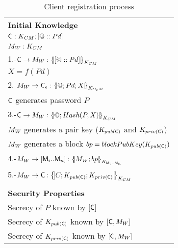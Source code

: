 \begin{table}[htb]
\footnotesize
\begin{center}
\caption{Client registration process}
\label{table:reqSessKey}
\begin{tabular}{|l|}
\hline
\textbf{Initial Knowledge}                                                        \\
$\textsf{C}:K_{CM}; [@::Pd]$                                                    \\
$M_{W}: K_{CM}$                                                            \\ \hline \hline
1.-$\Client\rightarrow \ServerW:\fat{[@::Pd]}_{K_{\client\serverW}}$                     \\
\hspace{5mm} $X=f(Pd) $                           \\ 
2.-$\ServerW\rightarrow \Client_e: \fat{@\lnk Pd \lnk X}_{K_{\client_e\serverW}} $                  \\ 
\hspace{5mm} $\textsf{C}$ generates password $P$                          \\  
3.-$\Client\rightarrow \ServerW:\fat{@\lnk Hash(P,X)}_{K_{\client\serverW}}$                 \\  
\hspace{5mm} $M_{W}$ generates a pair key ($K_{pub(\textsf{C})}$ and $K_{priv(\textsf{C})}$)\\
\hspace{5mm} $M_{W}$ generates a block $bp = blockPubKey(K_{pub(\textsf{C})})$\\
4.-$\ServerW\rightarrow [\Server_i .. \Server_n]: \fat{\ServerW \lnk bp}_{K_{\Server_i .. \Server_n}}$  \\  
5.-$\ServerW\rightarrow \Client: \fat{C \lnk K_{pub(\Client)}\lnk K_{priv(\Client)}}_{K_{\client\serverW}}$          \\\\            \hline
\textbf{Security Properties}                        \\
\hspace{5mm}Secrecy of $P$ known by $[\textsf{C}]$ \\
\hspace{5mm}Secrecy of $K_{pub(\textsf{C})}$ known by $[\textsf{C},M_{W}]$ \\
\hspace{5mm}Secrecy of $K_{priv(\textsf{C})}$ known by $[\textsf{C},M_{W}]$ \\\hline \hline 
\end{tabular}
\end{center}
\end{table}
\normalsize

